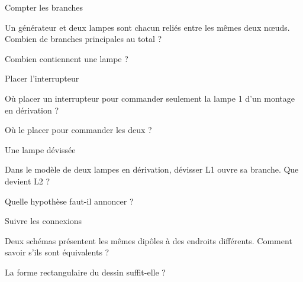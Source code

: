 \clearpage{}
\par\noindent\begin{minipage}{\linewidth}
\begin{exercice}[2]{Compter les branches}
\begin{questions}
\item Un générateur et deux lampes sont chacun reliés entre les mêmes deux nœuds. Combien de branches principales au total ?
\item Combien contiennent une lampe ?
\end{questions}
\end{exercice}
\end{minipage}
\par\noindent\begin{minipage}{\linewidth}
\begin{exercice}[2]{Placer l’interrupteur}
\begin{questions}
\item Où placer un interrupteur pour commander seulement la lampe 1 d’un montage en dérivation ?
\item Où le placer pour commander les deux ?
\end{questions}
\end{exercice}
\end{minipage}
\par\noindent\begin{minipage}{\linewidth}
\begin{exercice}[2]{Une lampe dévissée}
\begin{questions}
\item Dans le modèle de deux lampes en dérivation, dévisser L1 ouvre sa branche. Que devient L2 ?
\item Quelle hypothèse faut-il annoncer ?
\end{questions}
\end{exercice}
\end{minipage}
\par\noindent\begin{minipage}{\linewidth}
\begin{exercice}[2]{Suivre les connexions}
\begin{questions}
\item Deux schémas présentent les mêmes dipôles à des endroits différents. Comment savoir s’ils sont équivalents ?
\item La forme rectangulaire du dessin suffit-elle ?
\end{questions}
\end{exercice}
\end{minipage}
